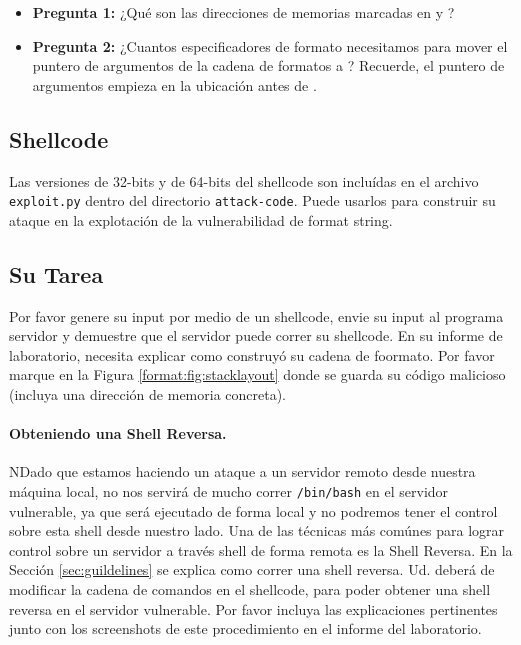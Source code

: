 \begin{itemize}[noitemsep]
\item \textbf{Pregunta 1:} ¿Qué son las direcciones de memorias marcadas en    y ?

\item \textbf{Pregunta 2:} ¿Cuantos especificadores de formato necesitamos para mover el puntero de argumentos de la cadena de formatos a ? Recuerde, el puntero de argumentos empieza en la ubicación antes de . 
\end{itemize} 



\subsection{Shellcode} 



Las versiones de 32-bits y de 64-bits del shellcode son incluídas en el archivo \texttt{exploit.py} dentro del directorio \texttt{attack-code}. 
Puede usarlos para construir su ataque en la explotación de la vulnerabilidad de format string.


\subsection{Su Tarea} 

Por favor genere su input por medio de un shellcode, envie su input al programa servidor y demuestre que el servidor puede correr su shellcode.
En su informe de laboratorio, necesita explicar como construyó su cadena de foormato. Por favor marque en la Figura \ref{format:fig:stacklayout} donde se guarda su código malicioso (incluya una dirección de memoria concreta).


\paragraph{Obteniendo una Shell Reversa.}
NDado que estamos haciendo un ataque a un servidor remoto desde nuestra máquina local, no nos servirá de mucho correr \texttt{/bin/bash} en el servidor vulnerable, ya que será ejecutado de forma local y no podremos tener el control sobre esta shell desde nuestro lado. Una de las técnicas más comúnes para lograr control sobre un servidor a través shell de forma remota es la Shell Reversa. En la Sección \ref{sec:guildelines} se explica como correr una shell reversa.
Ud. deberá de modificar la cadena de comandos en el shellcode, para poder obtener una shell reversa en el servidor vulnerable.
Por favor incluya las explicaciones pertinentes junto con los screenshots de este procedimiento en el informe del laboratorio.



